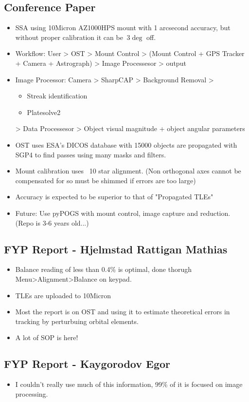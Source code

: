 \documentclass[../main.tex]{subfiles}
\begin{document}
\subsection{Conference Paper}
\begin{itemize}
    \item SSA using 10Micron AZ1000HPS mount with 1 arcsecond accuracy, but without proper calibration it can be $~3\deg$ off.
    \item Workflow: User > OST > Mount Control > (Mount Control + GPS Tracker + Camera + Astrograph) > Image Processesor > output
    \item Image Processor: Camera > SharpCAP > Background Removal >
    \begin{itemize}
        \item Streak identification
        \item Platesolve2
    \end{itemize}
    > Data Processesor > Object visual magnitude + object angular parameters
    \item OST uses ESA's DICOS database with 15000 objects are propagated with SGP4 to find passes using many masks and filters.
    \item Mount calibration uses ~10 star alignment. (Non orthogonal axes cannot be compensated for so must be shimmed if errors are too large)
    \item Accuracy is expected to be superior to that of "Propagated TLEs"
    \item Future: Use pyPOGS with mount control, image capture and reduction. (Repo is 3-6 years old...)
\end{itemize}
\subsection{FYP Report - Hjelmstad Rattigan Mathias}
\begin{itemize}
    \item Balance reading of less than 0.4\% is optimal, done thorugh Menu>Alignment>Balance on keypad.
    \item TLEs are uploaded to 10Micron
    \item Most the report is on OST and using it to estimate theoretical errors in tracking by perturbuing orbital elements.
    \item A lot of SOP is here!
\end{itemize}
\subsection{FYP Report - Kaygorodov Egor}
\begin{itemize}
    \item I couldn't really use much of this information, 99\% of it is focused on image processing.
\end{itemize}
\end{document}
